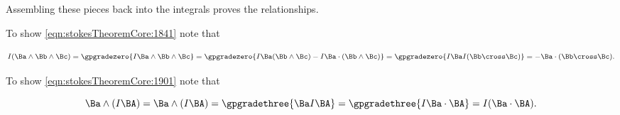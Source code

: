 {Assembling these pieces back into the integrals proves the relationships.


To show \cref{eqn:stokesTheoremCore:1841} note that

\begin{dmath}\label{eqn:stokesTheoremCoreProblems:260}
I (\Ba \wedge \Bb \wedge \Bc)
=
\gpgradezero{ I \Ba \wedge \Bb \wedge \Bc }
=
\gpgradezero{ I \Ba (\Bb \wedge \Bc) -
I \Ba \cdot (\Bb \wedge \Bc)
}
=
\gpgradezero{ I \Ba I(\Bb \cross \Bc) }
=
- \Ba \cdot (\Bb \cross \Bc).
\end{dmath}

To show \cref{eqn:stokesTheoremCore:1901} note that

\begin{dmath}\label{eqn:stokesTheoremCoreProblems:280}
\Ba \wedge (I \BA)
=
\Ba \wedge (I \BA)
=
\gpgradethree{ \Ba I \BA }
=
\gpgradethree{ I \Ba \cdot \BA }
=
I (\Ba \cdot \BA).
\end{dmath}

} %
